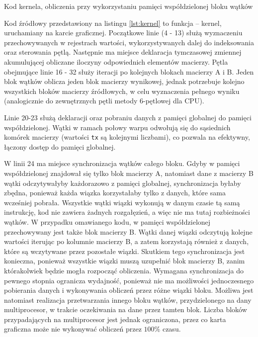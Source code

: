 \documentclass[12pt,a4paper]{article}
\begin{document}

\begin{listing}[H]
\inputminted{cuda}{listings/kernel.cu}
\caption{Kod kernela, obliczenia przy wykorzystaniu pamięci współdzielonej bloku wątków}
\label{lst:kernel}
\end{listing}

\newpage
Kod źródłowy przedstawiony na listingu \ref{lst:kernel} to funkcja -- kernel, uruchamiany na karcie graficznej. Początkowe linie (4 - 13) służą wyznaczeniu przechowywanych w rejestrach wartości, wykorzystywanych dalej do indeksowania oraz sterowania pętlą. Następnie ma miejsce deklaracja tymczasowej zmiennej akumulującej obliczane iloczyny odpowiednich elementów macierzy. Pętla obejmujące linie 16 - 32 służy iteracji po kolejnych blokach macierzy A i B. Jeden blok wątków oblicza jeden blok macierzy wynikowej, jednak potrzebuje kolejno wszystkich bloków macierzy źródłowych, w celu wyznaczenia pełnego wyniku (analogicznie do zewnętrznych pętli metody 6-pętlowej dla CPU).

Linie 20-23 służą deklaracji oraz pobraniu danych z pamięci globalnej do pamięci współdzielonej. Wątki w ramach połowy warpu odwołują się do sąsiednich komórek macierzy (wartości \verb|tx| są kolejnymi liczbami), co pozwala na efektywny, łączony dostęp do pamięci globalnej.

W linii 24 ma miejsce synchronizacja wątków całego bloku. Gdyby w pamięci współdzielonej znajdował się tylko blok macierzy A, natomiast dane z macierzy B wątki odczytywałyby każdorazowo z pamięci globalnej, synchronizacja byłaby zbędna, ponieważ każda wiązka korzystałaby tylko z danych, które sama wcześniej pobrała. Wszystkie wątki wiązki wykonują w danym czasie tą samą instrukcję, kod nie zawiera żadnych rozgałęzień, a więc nie ma tutaj rozbieżności wątków. W przypadku omawianego kodu, w pamięci współdzielonej przechowywany jest także blok macierzy B.
Wątki danej wiązki odczytują kolejne wartości iterując po kolumnie macierzy B, a zatem korzystają również z danych, które są wczytywane przez pozostałe wiązki. Skutkiem tego synchronizacja jest konieczna, ponieważ wszystkie wiązki muszą uzupełnić blok macierzy B, zanim którakolwiek będzie mogła rozpocząć obliczenia. Wymagana synchronizacja do pewnego stopnia ogranicza wydajność, ponieważ nie ma możliwości jednoczesnego pobierania danych i wykonywania obliczeń przez różne wiązki bloku. Możliwa jest natomiast realizacja przetwarzania innego bloku wątków, przydzielonego na dany multiprocesor, w trakcie oczekiwania na dane przez tamten blok. Liczba bloków przypadających na multiprocesor jest jednak ograniczona, przez co karta graficzna może nie wykonywać obliczeń przez $100\%$ czasu.
\end{document}
